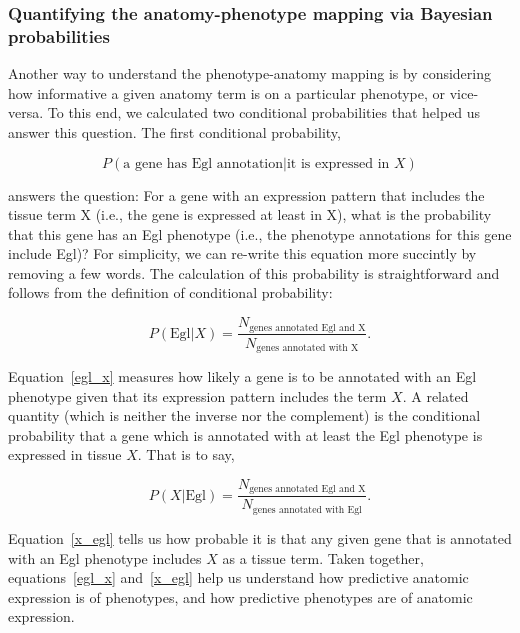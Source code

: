 \documentclass[10pt,letterpaper,twocolumn]{article}
\begin{document}
\subsubsection*{Quantifying the anatomy-phenotype
                mapping via Bayesian probabilities}
Another way to understand the phenotype-anatomy mapping is by considering
how informative a given anatomy term is on a particular phenotype, or vice-versa.
To this end, we calculated two conditional probabilities that helped us answer
this question. The first conditional probability,

\begin{equation}
  P( \text{a gene has Egl annotation} | \text{it is expressed in } X)
\end{equation}

answers the question: For a gene with an expression pattern that includes the
tissue term X (i.e., the gene is expressed at least in X), what is the probability
that this gene has an Egl phenotype (i.e., the phenotype annotations for this
gene include Egl)? For simplicity, we can re-write this equation more succintly
by removing a few words. The calculation of this probability is straightforward
and follows from the definition of conditional probability:

\begin{equation}
  P(\text{Egl}|X) = \frac{N_\text{genes annotated Egl and X}}
                         {N_\text{genes annotated with X}}.
\label{egl_x}
\end{equation}

Equation~\ref{egl_x} measures how likely a gene is to be annotated with an Egl
phenotype given that its expression pattern includes the term $X$. A related
quantity (which is neither the inverse nor the complement) is the conditional
probability that a gene which is annotated with at least the Egl phenotype is
expressed in tissue $X$. That is to say,

\begin{equation}
  P(X|\text{Egl}) = \frac{N_\text{genes annotated Egl and X}}
                         {N_\text{genes annotated with Egl}}.
  \label{x_egl}
\end{equation}

Equation~\ref{x_egl} tells us how probable it is that any given gene that is
annotated with an Egl phenotype includes $X$ as a tissue term. Taken together,
equations~\ref{egl_x} and~\ref{x_egl} help us understand how predictive
anatomic expression is of phenotypes, and how predictive phenotypes are of
anatomic expression.
\end{document}
